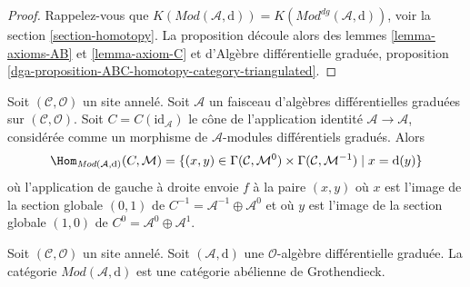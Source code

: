 \begin{proof}
Rappelez-vous que $K(\textit{Mod}(\mathcal{A}, \text{d})) = K(\textit{Mod}^{dg}(\mathcal{A}, \text{d}))$, voir la section \ref{section-homotopy}.
La proposition découle alors des lemmes \ref{lemma-axioms-AB} et \ref{lemma-axiom-C} et d'Algèbre différentielle graduée, proposition \ref{dga-proposition-ABC-homotopy-category-triangulated}.
\end{proof}

\begin{remark}
\label{remark-cone-identity}
Soit $(\mathcal{C}, \mathcal{O})$ un site annelé.
Soit $\mathcal{A}$ un faisceau d'algèbres différentielles graduées sur $(\mathcal{C}, \mathcal{O})$.
Soit $C = C(\text{id}_\mathcal{A})$ le cône de l'application identité $\mathcal{A} \to \mathcal{A}$, considérée comme un morphisme de $\mathcal{A}$-modules différentiels gradués. Alors
$$
\Hom_{\textit{Mod}(\mathcal{A}, \text{d})}(C, \mathcal{M}) =
\{(x, y) \in
\Gamma(\mathcal{C}, \mathcal{M}^0) \times
\Gamma(\mathcal{C}, \mathcal{M}^{-1}) \mid
x = \text{d}(y)\}
$$
où l'application de gauche à droite envoie $f$ à la paire $(x, y)$ où $x$ est l'image de la section globale $(0, 1)$ de $C^{-1} = \mathcal{A}^{-1} \oplus \mathcal{A}^0$ et où $y$ est l'image de la section globale $(1, 0)$ de $C^0 = \mathcal{A}^0 \oplus \mathcal{A}^1$.
\end{remark}

\begin{lemma}
\label{lemma-dgm-grothendieck-abelian}
Soit $(\mathcal{C}, \mathcal{O})$ un site annelé.
Soit $(\mathcal{A}, \text{d})$ une $\mathcal{O}$-algèbre différentielle graduée.
La catégorie $\textit{Mod}(\mathcal{A}, \text{d})$ est une catégorie abélienne de Grothendieck.
\end{lemma}

